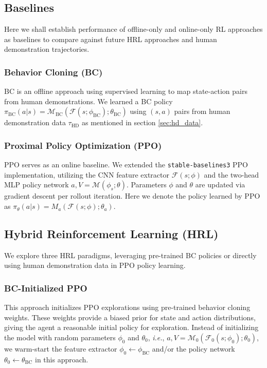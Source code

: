 \documentclass{article}
\begin{document}
\subsection{Baselines}
Here we shall establish performance of offline-only and online-only RL approaches
as baselines to compare against future HRL approaches and human demonstration trajectories. 

\subsubsection{Behavior Cloning (BC)} 
BC is an offline approach using supervised 
learning to map state-action pairs from human demonstrations. We learned 
a BC policy $\pi_{\text{BC}}(a|s) =
\mathcal{M}_{\text{BC}}(\mathcal{F}(s;\phi_{\text{BC}});\theta_{\text{BC}})$
using $(s,a)$ pairs from human demonstration data $\tau_{\text{HD}}$ as mentioned
in section \ref{sec:hd_data}.

\subsubsection{Proximal Policy Optimization (PPO)} 
PPO serves as an online baseline. We extended the 
\texttt{stable-baselines3} PPO implementation, utilizing the 
CNN feature extractor $\mathcal{F}(s;\phi)$ and the two-head 
MLP policy network $a, V = \mathcal{M}(\phi_s; \theta)$. 
Parameters $\phi$ and $\theta$ are updated via gradient 
descent per rollout iteration.
Here we denote the policy learned by PPO as 
$\pi_\theta(a|s) = M_a(\mathcal{F}(s;\phi);\theta_a)$.


\subsection{Hybrid Reinforcement Learning (HRL)}
We explore three HRL paradigms, leveraging pre-trained BC policies or 
directly using human demonstration data in PPO policy learning.

\subsubsection{BC-Initialized PPO}
This approach initializes PPO explorations using pre-trained behavior 
cloning weights. These weights provide a biased prior for state and 
action distributions, giving the agent a reasonable initial policy 
for exploration. 
Instead of initializing the model with random parameters 
$\phi_0$ and $\theta_0$, \textit{i.e.}, $a, V = \mathcal{M}_0(\mathcal{F}_0(s;\phi_0); 
\theta_0)$, we warm-start the feature extractor $\phi_0 \leftarrow 
\phi_{\text{BC}}$ and/or the policy network $\theta_0 \leftarrow 
\theta_{\text{BC}}$ in this approach.
\end{document}
